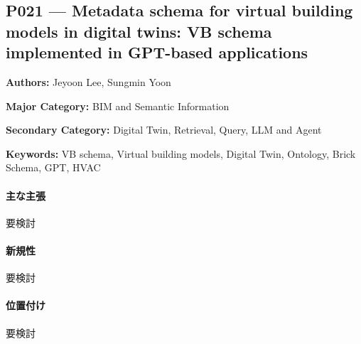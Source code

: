 \subsection{P021 --- Metadata schema for virtual building models in digital twins: VB schema implemented in GPT-based applications}
\label{paper:P021}
\textbf{Authors:} Jeyoon Lee, Sungmin Yoon\par
\textbf{Major Category:} BIM and Semantic Information\par
\textbf{Secondary Category:} Digital Twin, Retrieval, Query, LLM and Agent\par
\textbf{Keywords:} VB schema, Virtual building models, Digital Twin, Ontology, Brick Schema, GPT, HVAC\par
\paragraph{主な主張}
要検討 \cite{Lee:2025VBSchema}
\paragraph{新規性}
要検討
\paragraph{位置付け}
要検討
